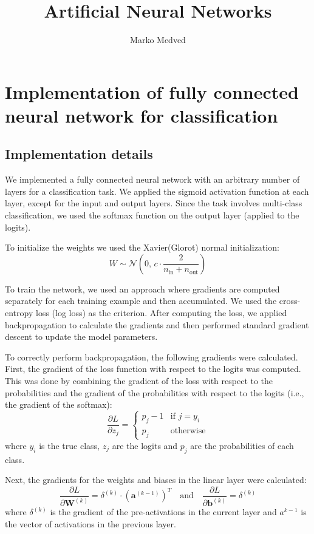 \documentclass[9pt]{IEEEtran}
\title{\vspace{0ex}
Artificial Neural Networks}
\author{Marko Medved\vspace{-4.0ex}}
\begin{document}
\maketitle

\section{Implementation of fully connected neural network for classification}
\subsection{Implementation details}
We implemented a fully connected neural network with an arbitrary number of layers for
 a classification task. We applied the sigmoid activation function at each layer, except
  for the input and output layers. Since the task involves multi-class classification,
   we used the softmax function on the output layer (applied to the logits).

   To initialize the weights we used the Xavier(Glorot) normal initialization: 
   \[
    W \sim \mathcal{N}\left(0, \, c \cdot \frac{2}{n_\text{in} + n_\text{out}}\right)
   \]

To train the network, we used an approach where gradients are computed 
separately for each training example and then accumulated. We used the 
cross-entropy loss (log loss) as the criterion. After computing the loss,
 we applied backpropagation to calculate the gradients and then performed 
 standard gradient descent to update the model parameters. 

 To correctly perform backpropagation, the following gradients were calculated. 
 First, the gradient of the loss function with respect to the logits was computed. 
 This was done by combining the gradient of the loss with respect to the probabilities 
 and the gradient of the probabilities with respect to the logits (i.e., the gradient of the softmax):
\[
\frac{\partial L}{\partial z_j} =
\begin{cases}
p_j - 1 & \text{if } j = y_i \\
p_j & \text{otherwise}
\end{cases}
\]
where $y_i$ is the true class, $z_j$ are the logits and $p_j$ are the probabilities of 
each class. 

Next, the gradients for the weights and biases in the linear layer were calculated:
\[
\frac{\partial L}{\partial \mathbf{W}^{(k)}} = \delta^{(k)} \cdot \left( \mathbf{a}^{(k-1)} \right)^T
\quad \text{and} \quad
\frac{\partial L}{\partial \mathbf{b}^{(k)}} = \delta^{(k)}
\]
where $ \delta^{(k)}$ is the gradient of the  pre-activations in the current layer and $a^{k-1}$ is the 
vector of activations in the previous layer. 
\end{document}
